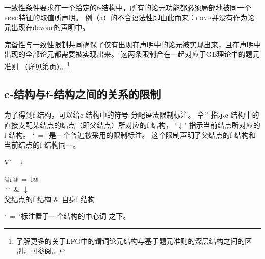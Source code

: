 \addlines
一致性条件要求在一个给定的f-结构中，所有的论元功能都必须局部地被同一个\textsc{pred}特征的取值所声明。
例（a）的不合语法性即由此而来：\textsc{comp}并没有作为论元出现在devour的声明中。

\eal
{}
\zl

\noindent
完备性与一致性限制共同确保了仅有出现在\pred 声明中的论元被实现出来，且在\pred 声明中出现的全部论元都需要被实现出来。
这两条限制合在一起对应于GB理论中的题元准则
（详见第\pageref{theta-Kriterium}页）。\footnote{%
了解更多的关于LFG中的谓词论元结构与基于题元准则的深层结构之间的区别，可参阅。
} 


\subsection{c-结构与f-结构之间的关系的限制}  

为了得到f-结构，可以给c-结构中的符号
分配语法限制标注。
令`\up'
\isc{$\uparrow$}\is{$\uparrow$}
指示c-结构中的直接支配某结点的结点（即父结点）所对应的f-结构，
`$\downarrow$'
\isc{$\downarrow$}\is{$\downarrow$}
指示当前结点所对应的f-结构。
`\up~=~\down'是一个普遍被采用的限制标注。
这个限制声明了父结点的f-结构和当前结点的f-结构同一。

\ea
V$'$ $\to$ \begin{tabular}[t]{@{}r@{~=~}l@{}}
           \\ %
           $\uparrow$ &  $\downarrow$\\ 
           父结点的f-结构 & 自身f-结构\\
           \end{tabular}
\z
`\up~=~\down'标注置于一个结构的中心词
之下。


